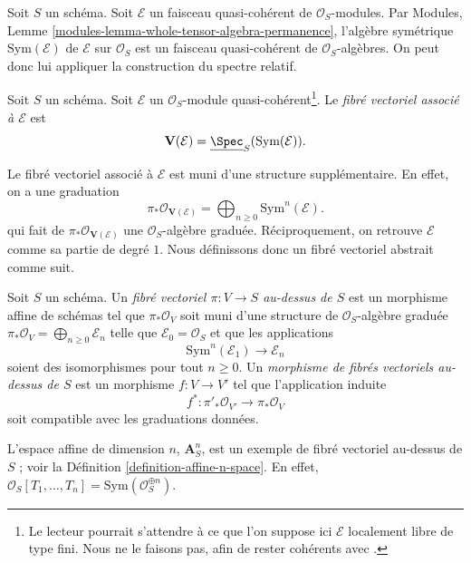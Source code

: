 \noindent
Soit $S$ un schéma.
Soit $\mathcal{E}$ un faisceau quasi-cohérent de $\mathcal{O}_S$-modules.
Par Modules, Lemme \ref{modules-lemma-whole-tensor-algebra-permanence},
l'algèbre symétrique $\text{Sym}(\mathcal{E})$ de
$\mathcal{E}$ sur $\mathcal{O}_S$
est un faisceau quasi-cohérent de $\mathcal{O}_S$-algèbres.
On peut donc lui appliquer la construction du spectre relatif.

\begin{definition}
\label{definition-vector-bundle}
Soit $S$ un schéma. Soit $\mathcal{E}$ un
$\mathcal{O}_S$-module quasi-cohérent\footnote{Le lecteur pourrait s'attendre
à ce que l'on suppose ici $\mathcal{E}$ localement libre de type fini. Nous ne
le faisons pas, afin de rester cohérents avec \cite[II, Definition 1.7.8]{EGA}.}.
Le {\it fibré vectoriel associé à $\mathcal{E}$} est
$$
\mathbf{V}(\mathcal{E}) = \underline{\Spec}_S(\text{Sym}(\mathcal{E})).
$$
\end{definition}

\noindent
Le fibré vectoriel associé à $\mathcal{E}$ est muni d'une structure
supplémentaire. En effet, on a une graduation
$$
\pi_*\mathcal{O}_{\mathbf{V}(\mathcal{E})} =
\bigoplus\nolimits_{n \geq 0} \text{Sym}^n(\mathcal{E}).
$$
qui fait de $\pi_*\mathcal{O}_{\mathbf{V}(\mathcal{E})}$
une $\mathcal{O}_S$-algèbre graduée. Réciproquement, on retrouve
$\mathcal{E}$ comme sa partie de degré $1$.
Nous définissons donc un fibré vectoriel abstrait comme suit.

\begin{definition}
\label{definition-abstract-vector-bundle}
Soit $S$ un schéma. Un {\it fibré vectoriel $\pi : V \to S$ au-dessus de $S$}
est un morphisme affine de schémas tel que $\pi_*\mathcal{O}_V$ soit muni
d'une structure de $\mathcal{O}_S$-algèbre graduée
$\pi_*\mathcal{O}_V = \bigoplus\nolimits_{n \geq 0} \mathcal{E}_n$
telle que $\mathcal{E}_0 = \mathcal{O}_S$ et que les applications
$$
\text{Sym}^n(\mathcal{E}_1) \longrightarrow \mathcal{E}_n
$$
soient des isomorphismes pour tout $n \geq 0$. Un {\it morphisme de fibrés
vectoriels au-dessus de $S$} est un morphisme $f : V \to V'$ tel que
l'application induite
$$
f^* : \pi'_*\mathcal{O}_{V'} \longrightarrow \pi_*\mathcal{O}_V
$$
soit compatible avec les graduations données.
\end{definition}

\noindent
L'espace affine de dimension $n$,
$\mathbf{A}^n_S$, est un exemple de fibré vectoriel au-dessus de $S$ ;
voir la Définition \ref{definition-affine-n-space}.
En effet,
$\mathcal{O}_S[T_1, \ldots, T_n] = \text{Sym}(\mathcal{O}_S^{\oplus n})$.

